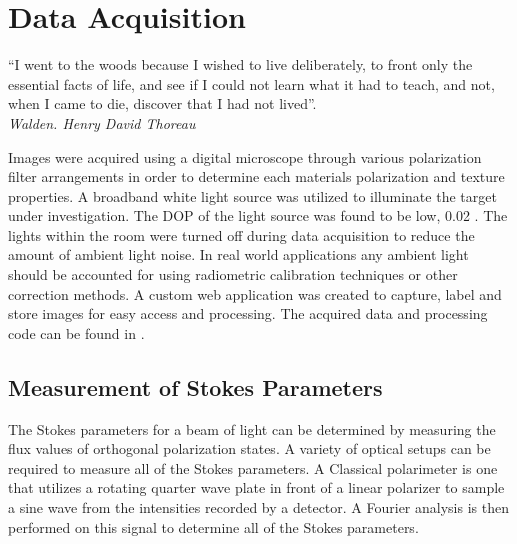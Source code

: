 \chapter{Data Acquisition}
\begin{center}
  \begin{minipage}{0.75\textwidth}
    \begin{small}
      “I went to the woods because I wished to live deliberately, to front only the essential facts of life, and see if I could not learn what it had to teach, and not, when I came to die, discover that I had not lived”.\\
      \null\hfill\emph{Walden. Henry David Thoreau}
    \end{small}
  \end{minipage}
  \vspace{0.5cm}
\end{center}

Images were acquired using a digital microscope through various polarization filter arrangements in order to determine each materials polarization and texture properties.  A broadband white light source was utilized to illuminate the target under investigation.  The DOP of the light source was found to be low, 0.02 \text{\%}. The lights within the room were turned off during data acquisition to reduce the amount of ambient light noise.  In real world applications any ambient light should be accounted for using radiometric calibration techniques or other correction methods.  A custom web application was created to capture, label and store images for easy access and processing.  The acquired data and processing code can be found in \cite{noob}.

\section{Measurement of Stokes Parameters}
The Stokes parameters for a beam of light can be determined by measuring the flux values of orthogonal polarization states.  A variety of optical setups can be required to measure all of the Stokes parameters.  A Classical polarimeter is one that utilizes a rotating quarter wave plate in front of a linear polarizer to sample a sine wave from the intensities recorded by a detector.  A Fourier analysis is then performed on this signal to determine all of the Stokes parameters.

